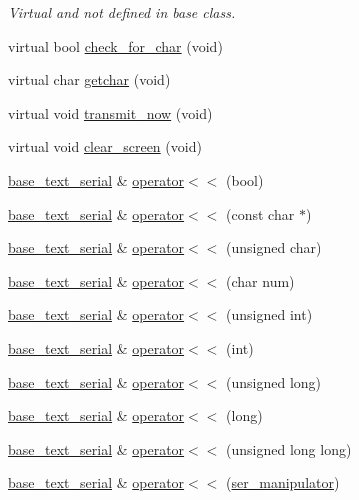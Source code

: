 \begin{DoxyCompactItemize}
\begin{DoxyCompactList}\small\item\em Virtual and not defined in base class. \end{DoxyCompactList}\item 
virtual bool \hyperlink{classbase__text__serial_aaaee97155296a26975e060ea230084ea}{check\-\_\-for\-\_\-char} (void)
\item 
virtual char \hyperlink{classbase__text__serial_a7c1fd4a7965a273cd7b24ca543f8dbae}{getchar} (void)
\item 
virtual void \hyperlink{classbase__text__serial_ac576f366ad6546797a0b0367015b385d}{transmit\-\_\-now} (void)
\item 
virtual void \hyperlink{classbase__text__serial_a1cb835087fb3dec71c044a2da373bba9}{clear\-\_\-screen} (void)
\item 
\hyperlink{classbase__text__serial}{base\-\_\-text\-\_\-serial} \& \hyperlink{classbase__text__serial_ad84dcb7707510b48f35fb279bad4e4d5}{operator$<$$<$} (bool)
\item 
\hyperlink{classbase__text__serial}{base\-\_\-text\-\_\-serial} \& \hyperlink{classbase__text__serial_ab47d2d832ae5218199b86d6dde1cecc9}{operator$<$$<$} (const char $\ast$)
\item 
\hyperlink{classbase__text__serial}{base\-\_\-text\-\_\-serial} \& \hyperlink{classbase__text__serial_a2ed7145ba442a8aaddc127ec6a6c3e42}{operator$<$$<$} (unsigned char)
\item 
\hyperlink{classbase__text__serial}{base\-\_\-text\-\_\-serial} \& \hyperlink{classbase__text__serial_aa1f0b7ddcc7ba49d948c112701990499}{operator$<$$<$} (char num)
\item 
\hyperlink{classbase__text__serial}{base\-\_\-text\-\_\-serial} \& \hyperlink{classbase__text__serial_ac6e7c3adbfd07474322036cb9c321039}{operator$<$$<$} (unsigned int)
\item 
\hyperlink{classbase__text__serial}{base\-\_\-text\-\_\-serial} \& \hyperlink{classbase__text__serial_ad50c16ab5d5e5a308dd3a261700cb222}{operator$<$$<$} (int)
\item 
\hyperlink{classbase__text__serial}{base\-\_\-text\-\_\-serial} \& \hyperlink{classbase__text__serial_a37eb2df4a84ff7af1c80e74a6f188f83}{operator$<$$<$} (unsigned long)
\item 
\hyperlink{classbase__text__serial}{base\-\_\-text\-\_\-serial} \& \hyperlink{classbase__text__serial_aaca5651e37bcd704e69d9f9569dfbd14}{operator$<$$<$} (long)
\item 
\hyperlink{classbase__text__serial}{base\-\_\-text\-\_\-serial} \& \hyperlink{classbase__text__serial_abde40cbd2f57b19fc3e0ef5f7a178a2d}{operator$<$$<$} (unsigned long long)
\item 
\hyperlink{classbase__text__serial}{base\-\_\-text\-\_\-serial} \& \hyperlink{classbase__text__serial_a51a9ffbd4ba8b557c7b61babf04e2e32}{operator$<$$<$} (\hyperlink{base__text__serial_8h_a5582483c459c0f48e51d96478d5b3407}{ser\-\_\-manipulator})
\end{DoxyCompactItemize}
